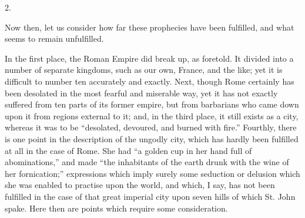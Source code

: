 2.

Now then, let us consider how far these prophecies have been
fulfilled, and what seems to remain unfulfilled.

In the first place, the Roman Empire did break up, as foretold. It
divided into a number of separate kingdoms, such as our own, France,
and the like; yet it is difficult to number ten accurately and
exactly. Next, though Rome certainly has been desolated in the most
fearful and miserable way, yet it has not exactly suffered from ten
parts of its former empire, but from barbarians who came down upon it
from regions external to it; and, in the third place, it still exists
as a city, whereas it was to be ``desolated, devoured, and burned
with fire.'' Fourthly, there is one point in the description
of the ungodly city, which has hardly been fulfilled at all in the
case of Rome. She had ``a golden cup in her hand full of
abominations,'' and made ``the inhabitants of the earth drunk
with the wine of her fornication;'' expressions which imply surely
some seduction or delusion which she was enabled to practise upon the
world, and which, I say, has not been fulfilled in the case of that
great imperial city upon seven hills of which St. John spake. Here
then are points which require some consideration.


